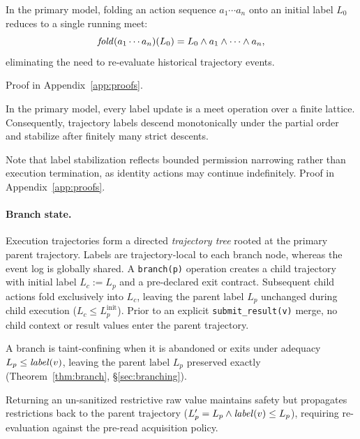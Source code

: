 \begin{proposition}[Collapse]\label{prop:collapse}
In the primary model, folding an action sequence $a_1 \cdots a_n$ onto an initial label $L_0$ reduces to a single running meet:
\[
  \mathit{fold}(a_1 \cdots a_n)(L_0) = L_0 \wedge a_1 \wedge \cdots \wedge a_n,
\]
eliminating the need to re-evaluate historical trajectory events.
\end{proposition}
Proof in Appendix~\ref{app:proofs}.

\begin{proposition}\label{prop:descent}
In the primary model, every label update is a meet operation over a finite lattice. Consequently, trajectory labels descend monotonically under the partial order and stabilize after finitely many strict descents.
\end{proposition}
Note that label stabilization reflects bounded permission narrowing rather than execution termination, as identity actions may continue indefinitely. Proof in Appendix~\ref{app:proofs}.

\paragraph{Branch state.}
Execution trajectories form a directed \emph{trajectory tree} rooted at the primary parent trajectory. Labels are trajectory-local to each branch node, whereas the event log is globally shared. A \texttt{branch(p)} operation creates a child trajectory with initial label $L_c := L_p$ and a pre-declared exit contract. Subsequent child actions fold exclusively into $L_c$, leaving the parent label $L_p$ unchanged during child execution ($L_c \le L_p^{\mathrm{init}}$). Prior to an explicit \texttt{submit\_result(v)} merge, no child context or result values enter the parent trajectory.

\begin{definition}\label{def:taint-confining}
A branch is taint-confining when it is abandoned or exits under adequacy $L_p \le \mathit{label}(v)$, leaving the parent label $L_p$ preserved exactly (Theorem~\ref{thm:branch}, \S\ref{sec:branching}).
\end{definition}
Returning an un-sanitized restrictive raw value maintains safety but propagates restrictions back to the parent trajectory ($L_p' = L_p \wedge \mathit{label}(v) \le L_p$), requiring re-evaluation against the pre-read acquisition policy.

